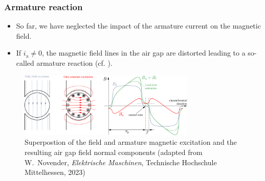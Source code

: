 \begin{frame}
	\frametitle{Armature reaction}
	\begin{itemize}
		\item So far, we have neglected the impact of the armature current on the magnetic field.
		\item If $i_\mathrm{a}\neq 0$, the magnetic field lines in the air gap are distorted leading to a so-called armature reaction (cf. ).
	\end{itemize}
    \begin{figure}
        \centering
        \includegraphics[width=0.75\textwidth]{fig/lec03/Armature_reaction.pdf}
        \caption{Superpostion of the field and armature magnetic excitation and the resulting air gap field normal components (adapted from W.~Novender, \textit{Elektrische Maschinen}, Technische Hochschule Mittelhessen, 2023)} 
		\label{fig:Armature_reaction}
    \end{figure}
\end{frame}

